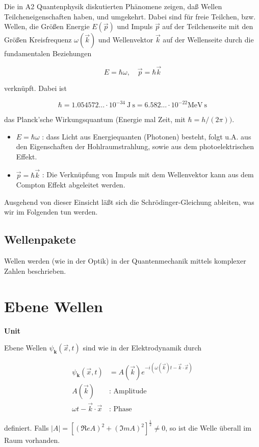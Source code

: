 \documentclass[10pt, letterpaper]{article}
\newenvironment{unit}[1]
  {\begin{unitbox}\textbf{Unit #1}\par\smallskip}
  {\end{unitbox}}
\begin{document}
Die in A2 Quantenphysik diskutierten Phänomene zeigen, daß Wellen Teilcheneigenschaften haben, und umgekehrt. Dabei sind für freie Teilchen, bzw. Wellen, die Größen Energie $E(\vec{p})$ und Impuls $\vec{p}$ auf der Teilchenseite mit den Größen Kreisfrequenz $\omega(\vec{k})$ und Wellenvektor $\vec{k}$ auf der Wellenseite durch die fundamentalen Beziehungen

$$
E=\hbar \omega, \quad \vec{p}=\hbar \vec{k}
$$

verknüpft. Dabei ist

$$
\hbar=1.054572 \ldots \cdot 10^{-34} \mathrm{~J} \mathrm{~s}=6.582 \ldots \cdot 10^{-22} \mathrm{MeV} \mathrm{~s}
$$

das Planck'sche Wirkungsquantum (Energie mal Zeit, mit $\hbar=h /(2 \pi))$.

\begin{itemize}
  \item $E=\hbar \omega$ : dass Licht aus Energiequanten (Photonen) besteht, folgt u.A. aus den Eigenschaften der Hohlraumstrahlung, sowie aus dem photoelektrischen Effekt.
  \item $\vec{p}=\hbar \vec{k}$ : Die Verknüpfung von Impuls mit dem Wellenvektor kann aus dem Compton Effekt abgeleitet werden.
\end{itemize}

Ausgehend von dieser Einsicht läßt sich die Schrödinger-Gleichung ableiten, was wir im Folgenden tun werden.

\subsection*{Wellenpakete}
Wellen werden (wie in der Optik) in der Quantenmechanik mittels komplexer Zahlen beschrieben.

\section*{Ebene Wellen}

    \begin{unit}{}
      Ebene Wellen $\psi_{\mathbf{k}}(\vec{x}, t)$ sind wie in der Elektrodynamik durch

      $$
      \begin{aligned}
      \psi_{\mathbf{k}}(\vec{x}, t) & =A(\vec{k}) e^{-i(\omega(\vec{k}) t-\vec{k} \cdot \vec{x})} \\
      A(\vec{k}) & : \text { Amplitude } \\
      \omega t-\vec{k} \cdot \vec{x} & : \text { Phase }
      \end{aligned}
      $$
      
      definiert. Falls $|A|=\left[(\Re e A)^{2}+(\Im m A)^{2}\right]^{\frac{1}{2}} \neq 0$, so ist die Welle überall im Raum vorhanden.
    \end{unit}
\end{document}
